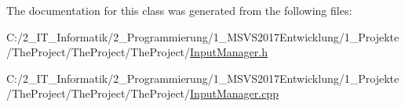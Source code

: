 The documentation for this class was generated from the following files\+:\begin{DoxyCompactItemize}
\item 
C\+:/2\+\_\+\+I\+T\+\_\+\+Informatik/2\+\_\+\+Programmierung/1\+\_\+\+M\+S\+V\+S2017\+Entwicklung/1\+\_\+\+Projekte/\+The\+Project/\+The\+Project/\+The\+Project/\mbox{\hyperlink{_input_manager_8h}{Input\+Manager.\+h}}\item 
C\+:/2\+\_\+\+I\+T\+\_\+\+Informatik/2\+\_\+\+Programmierung/1\+\_\+\+M\+S\+V\+S2017\+Entwicklung/1\+\_\+\+Projekte/\+The\+Project/\+The\+Project/\+The\+Project/\mbox{\hyperlink{_input_manager_8cpp}{Input\+Manager.\+cpp}}\end{DoxyCompactItemize}
